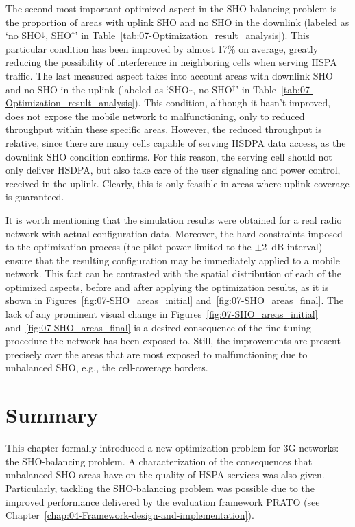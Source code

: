 The second most important optimized aspect in the SHO-balancing problem
is the proportion of areas with uplink SHO and no SHO in the downlink
(labeled as `no SHO$^{\downarrow}$, SHO$^{\uparrow}$' in Table~\ref{tab:07-Optimization_result_analysis}).
This particular condition has been improved by almost 17\% on average,
greatly reducing the possibility of interference in neighboring cells
when serving HSPA traffic. The last measured aspect takes into account
areas with downlink SHO and no SHO in the uplink (labeled as `SHO$^{\downarrow}$,
no SHO$^{\uparrow}$' in Table~\ref{tab:07-Optimization_result_analysis}).
This condition, although it hasn't improved, does not expose the mobile
network to malfunctioning, only to reduced throughput within these
specific areas. However, the reduced throughput is relative, since
there are many cells capable of serving HSDPA data access, as the
downlink SHO condition confirms. For this reason, the serving cell
should not only deliver HSDPA, but also take care of the user signaling
and power control, received in the uplink. Clearly, this is only feasible
in areas where uplink coverage is guaranteed.

It is worth mentioning that the simulation results were obtained for
a real radio network with actual configuration data. Moreover, the
hard constraints imposed to the optimization process (the pilot power
limited to the $\pm$2~dB interval) ensure that the resulting configuration
may be immediately applied to a mobile network. This fact can be contrasted
with the spatial distribution of each of the optimized aspects, before
and after applying the optimization results, as it is shown in Figures~\ref{fig:07-SHO_areas_initial}
and~\ref{fig:07-SHO_areas_final}. The lack of any prominent visual
change in Figures~\ref{fig:07-SHO_areas_initial} and~\ref{fig:07-SHO_areas_final}
is a desired consequence of the fine-tuning procedure the network
has been exposed to. Still, the improvements are present precisely
over the areas that are most exposed to malfunctioning due to unbalanced
SHO, e.g., the cell-coverage borders.


\section{Summary \label{sec:07-Summary}}

This chapter formally introduced a new optimization problem for 3G
networks: the SHO-balancing problem. A characterization of the consequences
that unbalanced SHO areas have on the quality of HSPA services was
also given. Particularly, tackling the SHO-balancing problem was possible
due to the improved performance delivered by the evaluation framework
PRATO (see Chapter~\ref{chap:04-Framework-design-and-implementation}).

